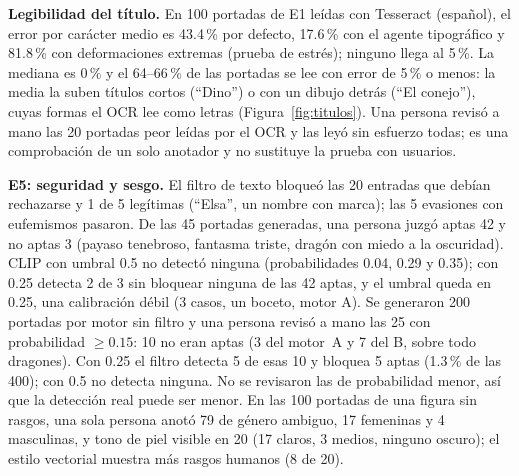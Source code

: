 \documentclass[10pt,a4paper,twocolumn]{article}
\begin{document}
\textbf{Legibilidad del título.} En 100 portadas de E1 leídas con Tesseract (español), el error por carácter medio es 43.4\,\% por defecto, 17.6\,\% con el agente tipográfico y 81.8\,\% con deformaciones extremas (prueba de estrés); ninguno llega al 5\,\%. La mediana es 0\,\% y el 64--66\,\% de las portadas se lee con error de 5\,\% o menos: la media la suben títulos cortos (``Dino'') o con un dibujo detrás (``El conejo''), cuyas formas el OCR lee como letras (Figura~\ref{fig:titulos}). Una persona revisó a mano las 20 portadas peor leídas por el OCR y las leyó sin esfuerzo todas; es una comprobación de un solo anotador y no sustituye la prueba con usuarios.

\textbf{E5: seguridad y sesgo.} El filtro de texto bloqueó las 20 entradas que debían rechazarse y 1 de 5 legítimas (``Elsa'', un nombre con marca); las 5 evasiones con eufemismos pasaron. De las 45 portadas generadas, una persona juzgó aptas 42 y no aptas 3 (payaso tenebroso, fantasma triste, dragón con miedo a la oscuridad). CLIP con umbral 0.5 no detectó ninguna (probabilidades 0.04, 0.29 y 0.35); con 0.25 detecta 2 de 3 sin bloquear ninguna de las 42 aptas, y el umbral queda en 0.25, una calibración débil (3 casos, un boceto, motor A). Se generaron 200 portadas por motor sin filtro y una persona revisó a mano las 25 con probabilidad $\geq 0.15$: 10 no eran aptas (3 del motor~A y 7 del B, sobre todo dragones). Con 0.25 el filtro detecta 5 de esas 10 y bloquea 5 aptas (1.3\,\% de las 400); con 0.5 no detecta ninguna. No se revisaron las de probabilidad menor, así que la detección real puede ser menor. En las 100 portadas de una figura sin rasgos, una sola persona anotó 79 de género ambiguo, 17 femeninas y 4 masculinas, y tono de piel visible en 20 (17 claros, 3 medios, ninguno oscuro); el estilo vectorial muestra más rasgos humanos (8 de 20).
\end{document}
